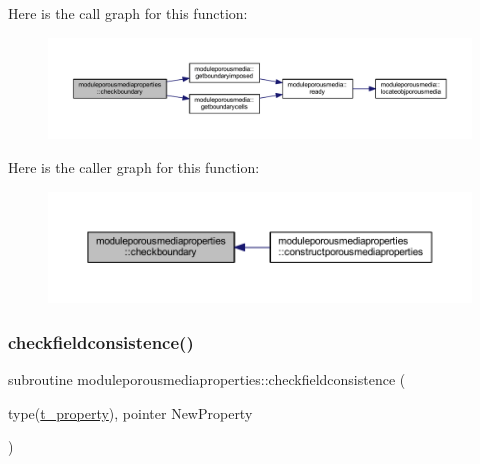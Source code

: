 Here is the call graph for this function\+:\nopagebreak
\begin{figure}[H]
\begin{center}
\leavevmode
\includegraphics[width=350pt]{namespacemoduleporousmediaproperties_a9384815199fb37590dac347563039152_cgraph}
\end{center}
\end{figure}
Here is the caller graph for this function\+:\nopagebreak
\begin{figure}[H]
\begin{center}
\leavevmode
\includegraphics[width=350pt]{namespacemoduleporousmediaproperties_a9384815199fb37590dac347563039152_icgraph}
\end{center}
\end{figure}
\mbox{\label{namespacemoduleporousmediaproperties_a2f7af623d77295c6b462fed30cf66e1b}} 
\subsubsection{\texorpdfstring{checkfieldconsistence()}{checkfieldconsistence()}}
{\footnotesize\ttfamily subroutine moduleporousmediaproperties\+::checkfieldconsistence (\begin{DoxyParamCaption}\item[{type(\mbox{\hyperlink{structmoduleporousmediaproperties_1_1t__property}{t\+\_\+property}}), pointer}]{New\+Property }\end{DoxyParamCaption})\hspace{0.3cm}{\ttfamily [private]}}

